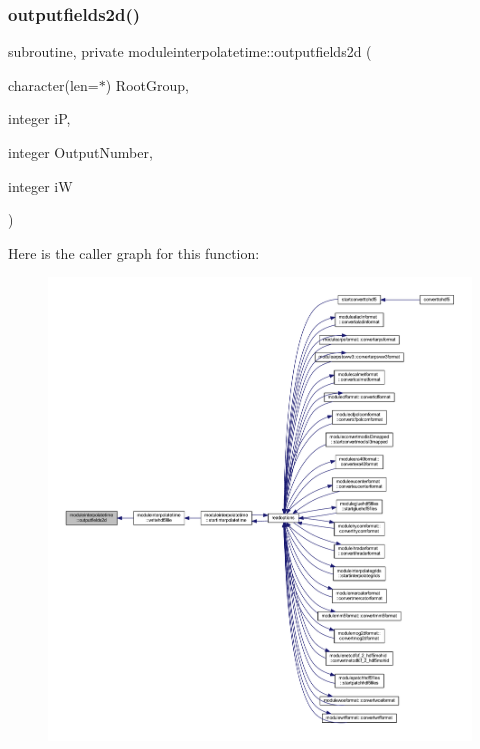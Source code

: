 \subsubsection{\texorpdfstring{outputfields2d()}{outputfields2d()}}
{\footnotesize\ttfamily subroutine, private moduleinterpolatetime\+::outputfields2d (\begin{DoxyParamCaption}\item[{character(len=$\ast$)}]{Root\+Group,  }\item[{integer}]{iP,  }\item[{integer}]{Output\+Number,  }\item[{integer}]{iW }\end{DoxyParamCaption})\hspace{0.3cm}{\ttfamily [private]}}

Here is the caller graph for this function\+:\nopagebreak
\begin{figure}[H]
\begin{center}
\leavevmode
\includegraphics[width=350pt]{namespacemoduleinterpolatetime_a89452771fcee1960a251bf4fb95851c6_icgraph}
\end{center}
\end{figure}
\mbox{\label{namespacemoduleinterpolatetime_afb140a4246a55d10d57741eac9e8472e}} 
